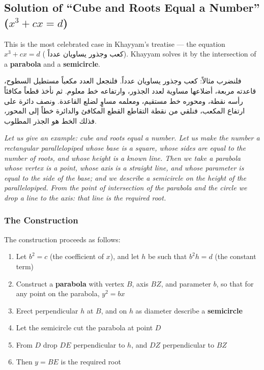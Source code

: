 \subsection{Solution of ``Cube and Roots Equal a Number'' ($x^3 + cx = d$)}

\label{subsec:classic-case}
This is the most celebrated case in Khayyam's treatise --- the equation $x^3 + c x = d$ (
\textarabic{كعب وجذور يساويان عدداً}).
Khayyam solves it by the intersection of a 
\textbf{parabola} and a 
\textbf{semicircle}.

\begin{propositionbox}
[Case: $x^3 + c x = d$]

\begin{Arabic}
فلنضرب مثالاً: كعب وجذور يساويان عدداً. فلنجعل العدد مكعباً مستطيل السطوح، قاعدته مربعة، أضلاعها مساوية لعدد الجذور، وارتفاعه خط معلوم. ثم نأخذ قطعاً مكافئاً رأسه نقطة، ومحوره خط مستقيم، ومعلمه مساوٍ لضلع القاعدة. ونصف دائرة على ارتفاع المكعب، فنلقي من نقطة التقاطع القطع المكافئ والدائرة خطاً إلى المحور، فذلك الخط هو الجذر المطلوب.

\end{Arabic}

\textit{Let us give an example: cube and roots equal a number. Let us make the number a rectangular parallelopiped whose base is a square, whose sides are equal to the number of roots, and whose height is a known line. Then we take a parabola whose vertex is a point, whose axis is a straight line, and whose parameter is equal to the side of the base;
 and we describe a semicircle on the height of the parallelopiped. From the point of intersection of the parabola and the circle we drop a line to the axis: that line is the required root.}

\end{propositionbox}

\subsubsection{The Construction}

\label{subsubsec:construction}
The construction proceeds as follows:

\begin{enumerate}
[noitemsep]
\item Let $b^2 = c$ (the coefficient of $x$), and let $h$ be such that $b^2 h = d$ (the constant term)
\item Construct a 
\textbf{parabola} with vertex $B$, axis $BZ$, and parameter $b$, so that for any point on the parabola, $y^2 = b x$
\item Erect perpendicular $h$ at $B$, and on $h$ as diameter describe a 
\textbf{semicircle}
\item Let the semicircle cut the parabola at point $D$
\item From $D$ drop $DE$ perpendicular to $h$, and $DZ$ perpendicular to $BZ$
\item Then $y = BE$ is the required root

\end{enumerate}

